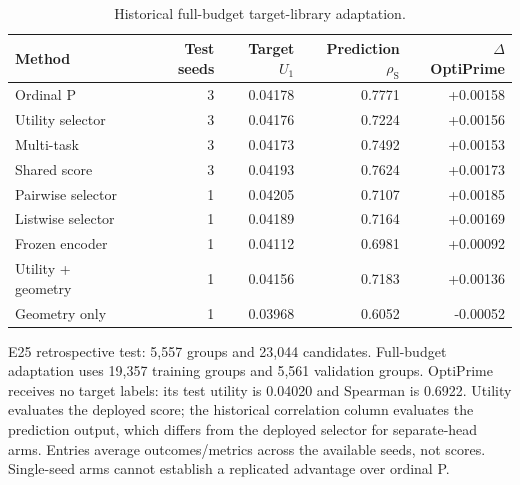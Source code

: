 \begin{table}[htbp]
\centering\small
\caption{Historical full-budget target-library adaptation.}
\label{tab:adaptation}
\begin{tabular}{lrrrr}
\toprule
Method & Test seeds & Target $U_1$ & Prediction $\rho_{\mathrm S}$ & $\Delta$ OptiPrime \\
\midrule
Ordinal P & 3 & 0.04178 & 0.7771 & +0.00158 \\
Utility selector & 3 & 0.04176 & 0.7224 & +0.00156 \\
Multi-task & 3 & 0.04173 & 0.7492 & +0.00153 \\
Shared score & 3 & 0.04193 & 0.7624 & +0.00173 \\
Pairwise selector & 1 & 0.04205 & 0.7107 & +0.00185 \\
Listwise selector & 1 & 0.04189 & 0.7164 & +0.00169 \\
Frozen encoder & 1 & 0.04112 & 0.6981 & +0.00092 \\
Utility + geometry & 1 & 0.04156 & 0.7183 & +0.00136 \\
Geometry only & 1 & 0.03968 & 0.6052 & -0.00052 \\
\bottomrule
\end{tabular}
\par\smallskip
\begin{minipage}{\linewidth}\footnotesize E25 retrospective test: 5,557 groups and 23,044 candidates. Full-budget adaptation uses 19,357 training groups and 5,561 validation groups. OptiPrime receives no target labels: its test utility is 0.04020 and Spearman is 0.6922. Utility evaluates the deployed score; the historical correlation column evaluates the prediction output, which differs from the deployed selector for separate-head arms. Entries average outcomes/metrics across the available seeds, not scores. Single-seed arms cannot establish a replicated advantage over ordinal P.\end{minipage}
\end{table}
